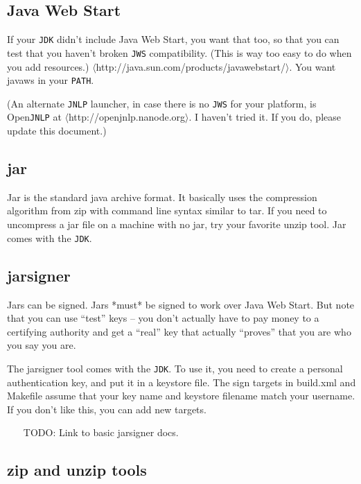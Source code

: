 \documentclass{article}
\begin{document}
\subsection{Java Web Start}

If your \texttt{JDK} didn't include Java Web Start, you want that too, so 
that you can test that you haven't broken \texttt{JWS} compatibility.  (This
is way too easy to do when you add resources.)
$\langle$http://java.sun.com/products/javawebstart/$\rangle$. You want javaws in your
\texttt{PATH}.

(An alternate \texttt{JNLP} launcher, in case there is no \texttt{JWS} for your platform,
is Open\texttt{JNLP} at $\langle$http://openjnlp.nanode.org$\rangle$. I haven't
tried it. If you do, please update this document.)

\subsection{jar}

Jar is the standard java archive format.  It basically uses the compression 
algorithm from zip with command line syntax similar to tar.  If you need to 
uncompress a jar file on a machine with no jar, try your favorite unzip tool.  
Jar comes with the \texttt{JDK}.

\subsection{jarsigner}

Jars can be signed.  Jars *must* be signed to work over Java Web Start.
But note that you can use ``test'' keys -- you don't actually have to
pay money to a certifying authority and get a ``real'' key that actually
``proves'' that you are who you say you are.

The jarsigner tool comes with the \texttt{JDK}.  To use it, you need to create
a personal authentication key, and put it in a keystore file.  The sign
targets in build.xml and Makefile assume that your key name and keystore
filename match your username.  If you don't like this, you can add new
targets.

\begin{itemize}
\item[TODO:]  Link to basic jarsigner docs.
\end{itemize}

\subsection{zip and unzip tools}
\end{document}
